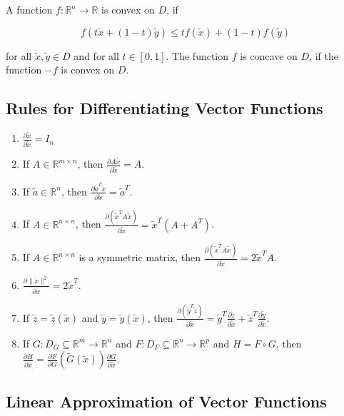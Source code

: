 \documentclass{article}
\begin{document}
\begin{multicols}{2}
A function \( f: \mathbb{R}^n \rightarrow \mathbb{R} \) is convex on \( D \), if

\[ f(t \tilde{x} + (1-t) \tilde{y}) \leq t f(\tilde{x}) + (1-t) f(\tilde{y}) \]

for all \( \tilde{x}, \tilde{y} \in D \) and for all \( t \in [0, 1] \). The function \( f \) is concave on \( D \), if the function \( -f \) is convex on \( D \).

\subsection{Rules for Differentiating Vector Functions}

\begin{enumerate}
    \item \(\frac{\partial \tilde{x}}{\partial \tilde{x}} = I_n\)
    \item If \( A \in \mathbb{R}^{m \times n} \), then \( \frac{\partial A\tilde{x}}{\partial \tilde{x}} = A \).
    \item If \( \tilde{a} \in \mathbb{R}^n \), then \( \frac{\partial \tilde{a}^T\tilde{x}}{\partial \tilde{x}} = \tilde{a}^T \).
    \item If \( A \in \mathbb{R}^{n \times n} \), then \( \frac{\partial (\tilde{x}^T A\tilde{x})}{\partial \tilde{x}} = \tilde{x}^T(A + A^T) \).
    \item If \( A \in \mathbb{R}^{n \times n} \) is a symmetric matrix, then \( \frac{\partial (\tilde{x}^T A\tilde{x})}{\partial \tilde{x}} = 2\tilde{x}^T A \).
    \item \( \frac{\partial \|\tilde{x}\|^2}{\partial \tilde{x}} = 2\tilde{x}^T \).
    \item If \( \tilde{z} = \tilde{z}(\tilde{x}) \) and \( \tilde{y} = \tilde{y}(\tilde{x}) \), then \( \frac{\partial (\tilde{y}^T \tilde{z})}{\partial \tilde{x}} = \tilde{y}^T \frac{\partial \tilde{z}}{\partial \tilde{x}} + \tilde{z}^T \frac{\partial \tilde{y}}{\partial \tilde{x}} \).
    \item If \( G: D_G \subseteq \mathbb{R}^m \rightarrow \mathbb{R}^n \) and \( F: D_F \subseteq \mathbb{R}^n \rightarrow \mathbb{R}^p \) and \( H = F \circ G \), then \( \frac{\partial H}{\partial \tilde{x}} = \frac{\partial F}{\partial G} (\tilde{G}(\tilde{x})) \frac{\partial G}{\partial \tilde{x}} \).
\end{enumerate}


\subsection{Linear Approximation of Vector Functions}


\end{multicols}
\end{document}

